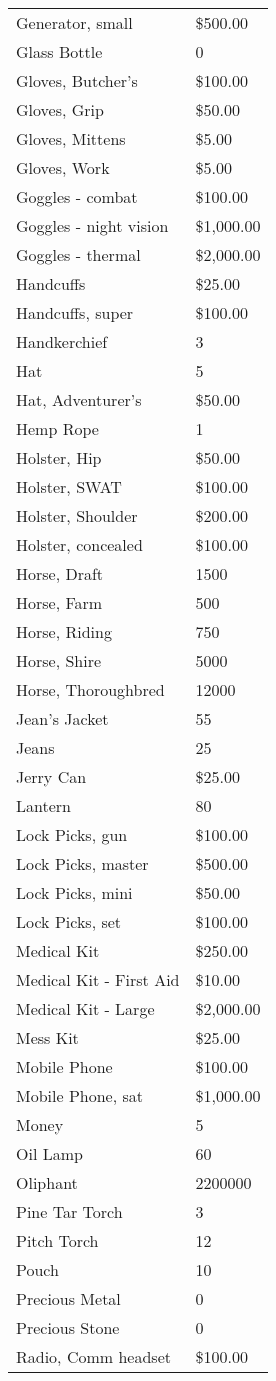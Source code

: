 \documentclass[twoside]{book}
\begin{document}
\begin{longtable}{p{1.25in}l}
      \raggedright  Generator, small& \$500.00\tabularnewline
      \raggedright  Glass Bottle& 0\tabularnewline
      \raggedright  Gloves, Butcher's& \$100.00\tabularnewline
      \raggedright  Gloves, Grip& \$50.00\tabularnewline
      \raggedright  Gloves, Mittens& \$5.00\tabularnewline
      \raggedright  Gloves, Work& \$5.00\tabularnewline
      \raggedright  Goggles - combat& \$100.00\tabularnewline
      \raggedright  Goggles - night vision& \$1,000.00\tabularnewline
      \raggedright  Goggles - thermal& \$2,000.00\tabularnewline
      \raggedright  Handcuffs& \$25.00\tabularnewline
      \raggedright  Handcuffs, super& \$100.00\tabularnewline
      \raggedright  Handkerchief& 3\tabularnewline
      \raggedright  Hat& 5\tabularnewline
      \raggedright  Hat, Adventurer's& \$50.00\tabularnewline
      \raggedright  Hemp Rope& 1\tabularnewline
      \raggedright  Holster, Hip& \$50.00\tabularnewline
      \raggedright  Holster, SWAT& \$100.00\tabularnewline
      \raggedright  Holster, Shoulder& \$200.00\tabularnewline
      \raggedright  Holster, concealed& \$100.00\tabularnewline
      \raggedright  Horse, Draft& 1500\tabularnewline
      \raggedright  Horse, Farm& 500\tabularnewline
      \raggedright  Horse, Riding& 750\tabularnewline
      \raggedright  Horse, Shire& 5000\tabularnewline
      \raggedright  Horse, Thoroughbred& 12000\tabularnewline
      \raggedright  Jean's Jacket& 55\tabularnewline
      \raggedright  Jeans& 25\tabularnewline
      \raggedright  Jerry Can& \$25.00\tabularnewline
      \raggedright  Lantern& 80\tabularnewline
      \raggedright  Lock Picks, gun& \$100.00\tabularnewline
      \raggedright  Lock Picks, master& \$500.00\tabularnewline
      \raggedright  Lock Picks, mini& \$50.00\tabularnewline
      \raggedright  Lock Picks, set& \$100.00\tabularnewline
      \raggedright  Medical Kit& \$250.00\tabularnewline
      \raggedright  Medical Kit - First Aid& \$10.00\tabularnewline
      \raggedright  Medical Kit - Large& \$2,000.00\tabularnewline
      \raggedright  Mess Kit& \$25.00\tabularnewline
      \raggedright  Mobile Phone& \$100.00\tabularnewline
      \raggedright  Mobile Phone, sat& \$1,000.00\tabularnewline
      \raggedright  Money& 5\tabularnewline
      \raggedright  Oil Lamp& 60\tabularnewline
      \raggedright  Oliphant& 2200000\tabularnewline
      \raggedright  Pine Tar Torch& 3\tabularnewline
      \raggedright  Pitch Torch& 12\tabularnewline
      \raggedright  Pouch& 10\tabularnewline
      \raggedright  Precious Metal& 0\tabularnewline
      \raggedright  Precious Stone& 0\tabularnewline
      \raggedright  Radio, Comm headset& \$100.00\tabularnewline

\end{longtable}
\end{document}
